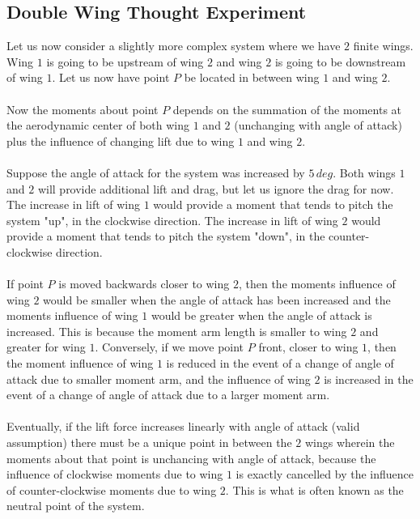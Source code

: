 \subsection{Double Wing Thought Experiment}
\begin{comment}
\end{comment}
Let us now consider a slightly more complex system where we have $2$ finite wings.
Wing $1$ is going to be upstream of wing $2$ and wing $2$ is going to be downstream of wing $1$.
Let us now have point $P$ be located in between wing $1$ and wing $2$.
\\~\\Now the moments about point $P$ depends on the summation of the moments at the aerodynamic center of both wing $1$ and $2$ (unchanging with angle of attack) plus the influence of changing lift due to wing $1$ and wing $2$.
\\~\\Suppose the angle of attack for the system was increased by $5\,deg$.
Both wings $1$ and $2$ will provide additional lift and drag, but let us ignore the drag for now. 
The increase in lift of wing $1$ would provide a moment that tends to pitch the system "up", in the clockwise direction. 
The increase in lift of wing $2$ would provide a moment that tends to pitch the system "down", in the counter-clockwise direction.
\\~\\If point $P$ is moved backwards closer to wing $2$, then the moments influence of wing $2$ would be smaller when the angle of attack has been increased and the moments influence of wing $1$ would be greater when the angle of attack is increased.
This is because the moment arm length is smaller to wing $2$ and greater for wing $1$.
Conversely, if we move point $P$ front, closer to wing $1$, then the moment influence of wing $1$ is reduced in the event of a change of angle of attack due to smaller moment arm, and the influence of wing $2$ is increased in the event of a change of angle of attack due to a larger moment arm.
\\~\\Eventually, if the lift force increases linearly with angle of attack (valid assumption) there must be a unique point in between the $2$ wings wherein the moments about that point is unchancing with angle of attack, because the influence of clockwise moments due to wing $1$ is exactly cancelled by the influence of counter-clockwise moments due to wing $2$.
This is what is often known as the neutral point of the system.

